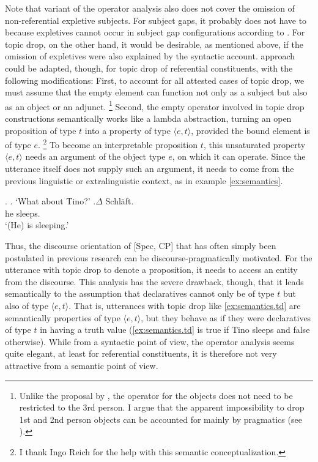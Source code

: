 Note that  variant of the operator analysis also does not cover the omission of non-referential expletive  subjects.
For subject gaps,  it probably does not have to because expletives cannot occur in subject gap configurations according to \citet[53]{reich2009}.
For topic drop, on the other hand, it would be desirable, as mentioned above, if the omission of expletives  were also explained by the syntactic account.
 approach could be adapted, though, for topic drop of referential constituents, with the following modifications:
First, to account for all attested cases of topic drop, we must assume that the empty element can function not only as a subject but also as an object or an adjunct.%
\footnote{Unlike the proposal by \citet{cardinaletti1990}, the operator for the objects does not need to be restricted to the 3rd person.
I argue that the apparent impossibility to drop 1st and 2nd person objects can be accounted for mainly by pragmatics (see ).}
%
Second, the empty operator involved in topic drop constructions semantically works like a lambda abstraction, turning an open proposition of type $t$ into a property of type $\langle e,t\rangle$, provided the bound element is of type $e$.%
\footnote{I thank Ingo Reich for the help with this semantic conceptualization.}
%
To become an interpretable proposition $t$, this unsaturated property $\langle e,t\rangle$ needs an argument of the object type $e$, on which it can operate.
Since the utterance itself does not supply such an argument, it needs to come from the previous linguistic or extralinguistic context, as in example \ref{ex:semantics}.

\ex.\label{ex:semantics}
\a. `What about Tino?'
\bg.\label{ex:semantics.td}$\Delta$ Schläft.\\
he sleeps. \\
`(He) is sleeping.'

Thus, the discourse orientation of [Spec, CP] that has often simply been postulated in previous research can be discourse-pragmatically motivated.
For the utterance with topic drop to denote a proposition, it needs to access an entity from the discourse.
This analysis has the severe drawback, though, that  it leads semantically to the assumption that declaratives cannot only be of type $t$ but also of type $\langle e,t\rangle$. 
That is, utterances with topic drop like \ref{ex:semantics.td} are semantically properties of type $\langle e,t\rangle$, but they behave as if they were declaratives of type $t$ in having a truth value (\ref{ex:semantics.td} is true if Tino sleeps and false otherwise).
While from a syntactic point of view, the operator analysis seems quite elegant, at least for referential constituents, it is therefore not very attractive from a semantic point of view.

